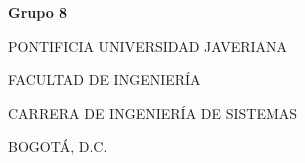 \begin{titlepage}
    \centering

    \vspace*{1cm}
    {\large\bfseries Grupo 8\par}

    \vspace{4cm}

    {\LARGE\bfseries \proyectoTitulo\par}

    \vspace{4cm}

    {\large \autorUno\par}
    \vspace{0.3cm}
    {\large \autorDos\par}

    \vfill

    {\large PONTIFICIA UNIVERSIDAD JAVERIANA\par}
    {\large FACULTAD DE INGENIERÍA\par}
    {\large CARRERA DE INGENIERÍA DE SISTEMAS\par}
    {\large BOGOTÁ, D.C.\par}
    {\large \anio\par}

\end{titlepage}
